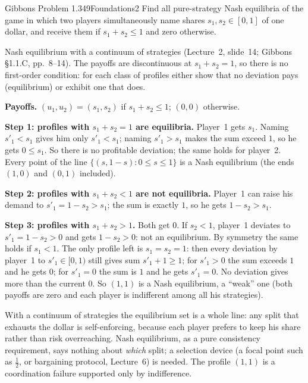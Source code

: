 \begin{exsol}{Gibbons Problem 1.3}{49}{Foundations}{2}
\asked Find all pure-strategy Nash equilibria of the game in which two players simultaneously name
shares $s_1, s_2 \in [0,1]$ of one dollar, and receive them if $s_1 + s_2 \le 1$ and zero otherwise.

\method Nash equilibrium with a continuum of strategies (Lecture~2, slide~14; Gibbons \S1.1.C,
pp.~8--14). The payoffs are discontinuous at $s_1 + s_2 = 1$, so there is no first-order condition:
for each class of profiles either show that no deviation pays (equilibrium) or exhibit one that does.

\solution
\textbf{Payoffs.} $(u_1, u_2) = (s_1, s_2)$ if $s_1 + s_2 \le 1$; $(0, 0)$ otherwise.

\textbf{Step 1: profiles with $s_1 + s_2 = 1$ are equilibria.} Player~1 gets $s_1$. Naming
$s'_1 < s_1$ gives him only $s'_1 < s_1$; naming $s'_1 > s_1$ makes the sum exceed $1$, so he gets
$0 \le s_1$. So there is no profitable deviation; the same holds for player~2. Every point of the line
$\{(s, 1-s): 0 \le s \le 1\}$ is a Nash equilibrium (the ends $(1,0)$ and $(0,1)$ included).

\textbf{Step 2: profiles with $s_1 + s_2 < 1$ are not equilibria.} Player~1 can raise his
demand to $s'_1 = 1 - s_2 > s_1$; the sum is exactly $1$, so he gets $1 - s_2 > s_1$.

\textbf{Step 3: profiles with $s_1 + s_2 > 1$.} Both get $0$. If $s_2 < 1$, player~1 deviates to
$s'_1 = 1 - s_2 > 0$ and gets $1 - s_2 > 0$: not an equilibrium. By symmetry the same holds if
$s_1 < 1$. The only profile left is $s_1 = s_2 = 1$: then every deviation by player~1 to
$s'_1 \in [0, 1)$ still gives sum $s'_1 + 1 \ge 1$; for $s'_1 > 0$ the sum exceeds $1$ and he gets $0$;
for $s'_1 = 0$ the sum is $1$ and he gets $s'_1 = 0$. No deviation gives more than the current $0$.
So $(1,1)$ is a Nash equilibrium, a ``weak'' one (both payoffs are zero and each player is indifferent
among all his strategies).


\interp With a continuum of strategies the equilibrium set is a whole line: any split that exhausts
the dollar is self-enforcing, because each player prefers to keep his share rather than risk
overreaching. Nash equilibrium, as a pure consistency requirement, says nothing about \emph{which}
split; a selection device (a focal point such as $\tfrac12$, or bargaining protocol, Lecture~6) is
needed. The profile $(1,1)$ is a coordination failure supported only by indifference.


\end{exsol}
